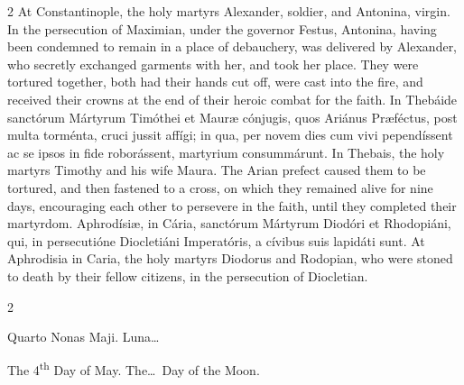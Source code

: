 \begin{paracol}{2}
At Constantinople, the holy martyrs 
 Alexander, soldier, and Antonina, virgin. In the persecution of 
 Maximian, under the governor Festus, Antonina, having been condemned to 
 remain in a place of debauchery, was delivered by Alexander, who secretly 
 exchanged garments with her, and took her place. They were tortured 
 together, both had their hands cut off, were cast into the fire, and 
 received their crowns at the end of their heroic combat for the faith.
\switchcolumn*
{}
In Thebáide sanctórum 
 Mártyrum Timóthei et Mauræ cónjugis, quos Ariánus Præféctus, post multa 
 torménta, cruci jussit affígi; in qua, per novem dies cum vivi pependíssent 
 ac se ipsos in fide roborássent, martyrium consummárunt.
\switchcolumn
{}
In Thebais, the holy martyrs 
 Timothy and his wife Maura. The Arian prefect caused them to be 
 tortured, and then fastened to a cross, on which they remained alive for 
 nine days, encouraging each other to persevere in the faith, until they 
 completed their martyrdom.
\switchcolumn*
{}
Aphrodísiæ, in Cária, 
 sanctórum Mártyrum Diodóri et Rhodopiáni, qui, in persecutióne Diocletiáni 
 Imperatóris, a cívibus suis lapidáti sunt.
\switchcolumn
{}
At Aphrodisia in Caria, the holy 
 martyrs Diodorus and Rodopian, who were stoned to death by their fellow 
 citizens, in the persecution of Diocletian.
\switchcolumn*
{}
\end{paracol}


\begin{paracol}{2}
\begin{center}{\color{gregoriocolor} Quarto Nonas Maji. 
 Luna\dots\ }\end{center}
\switchcolumn
{}
\begin{center}{\color{gregoriocolor} The 
 4\textsuperscript{th} Day of May. The\dots\ Day of the Moon.}\end{center}
\end{paracol}

